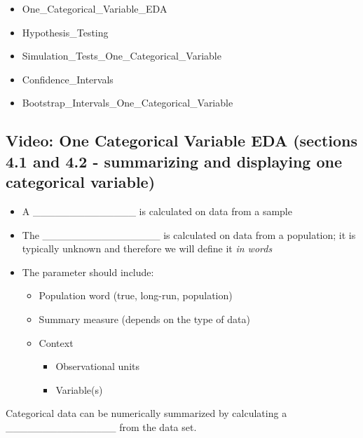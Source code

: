 \documentclass[
]{report}
\begin{document}
\begin{itemize}
\item
  One\_Categorical\_Variable\_EDA
\item
  Hypothesis\_Testing
\item
  Simulation\_Tests\_One\_Categorical\_Variable
\item
  Confidence\_Intervals
\item
  Bootstrap\_Intervals\_One\_Categorical\_Variable
\end{itemize}


\subsection*{Video: One Categorical Variable EDA (sections 4.1 and 4.2 - summarizing and displaying one categorical variable)}\label{video-one-categorical-variable-eda-sections-4.1-and-4.2---summarizing-and-displaying-one-categorical-variable}

\begin{itemize}
\item
  A \_\_\_\_\_\_\_\_\_\_\_\_\_\_ is calculated on data from a sample
\item
  The \_\_\_\_\_\_\_\_\_\_\_\_\_\_\_\_ is calculated on data from a population; it is typically unknown and therefore we will define it \emph{in words}
\item
  The parameter should include:

  \begin{itemize}
  \item
    Population word (true, long-run, population)
  \item
    Summary measure (depends on the type of data)
  \item
    Context

    \begin{itemize}
    \item
      Observational units
    \item
      Variable(s)
    \end{itemize}
  \end{itemize}
\end{itemize}

Categorical data can be numerically summarized by calculating a \_\_\_\_\_\_\_\_\_\_\_\_\_\_\_ from the data set.
\end{document}
